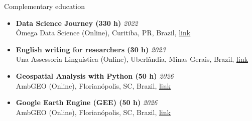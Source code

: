\documentclass{resume}
\begin{document}
\begin{rSection}{Complementary education}
\begin{itemize}
\item \textbf{Data Science Journey (330 h)} \hfill {\em 2022}\\
Ômega Data Science (Online), Curitiba, PR, Brazil, \href{https://omegadataacademy.com.br}{\underline{link}}

\item \textbf{English writing for researchers (30 h)} \hfill {\em 2023}\\
Una Assessoria Linguística (Online), Uberlândia, Minas Gerais, Brazil, \href{https://unalinguistica.com.br/}{\underline{link}}

\item \textbf{Geospatial Analysis with Python (50 h)} \hfill {\em 2026}\\
AmbGEO (Online), Florianópolis, SC, Brazil, \href{https://ambgeo.com}{\underline{link}}

\item \textbf{Google Earth Engine (GEE) (50 h)} \hfill {\em 2026}\\
AmbGEO (Online), Florianópolis, SC, Brazil, \href{https://ambgeo.com}{\underline{link}}
\end{itemize} 

\end{rSection}

\end{document}
